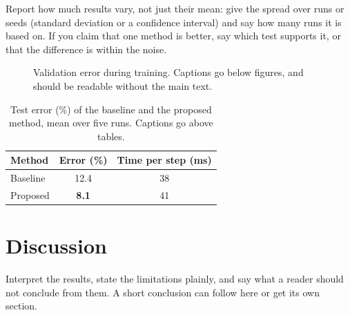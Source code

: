 \documentclass[11pt,a4paper]{article}
\begin{document}
Report how much results vary, not just their mean: give the spread over runs or seeds
(standard deviation or a confidence interval) and say how many runs it is based on. If you
claim that one method is better, say which test supports it, or that the difference is within
the noise.

\begin{figure}[ht]
  \centering
  \caption{Validation error during training. Captions go below figures, and should be
  readable without the main text.}
  \label{fig:curve}
\end{figure}

\begin{table}[ht]
  \centering
  \caption{Test error (\%) of the baseline and the proposed method, mean over five runs.
  Captions go above tables.}
  \label{tab:main}
  \begin{tabular}{lcc}
    \toprule
    Method & Error (\%) & Time per step (ms) \\
    \midrule
    Baseline & 12.4 & 38 \\
    Proposed & \textbf{8.1} & 41 \\
    \bottomrule
  \end{tabular}
\end{table}

\section{Discussion}
Interpret the results, state the limitations plainly, and say what a reader should not
conclude from them. A short conclusion can follow here or get its own section.
\end{document}
